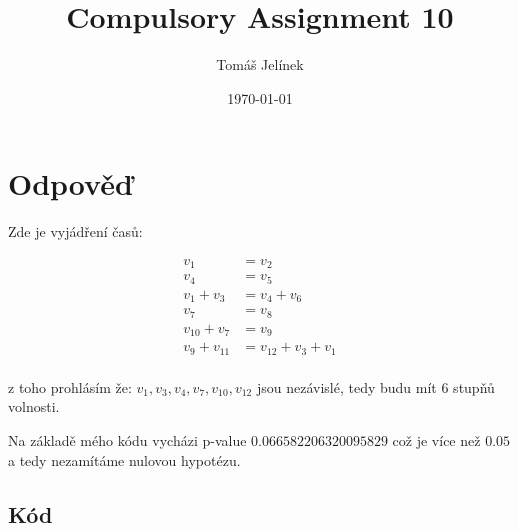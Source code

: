 \documentclass{article}
\title{Compulsory Assignment 10}
\author{Tomáš Jelínek}
\date{\today}
\begin{document}
\maketitle
\section*{Odpověď}

Zde je vyjádření časů:

\begin{align*}
    v_1 &= v_2 \\
    v_4 &= v_5 \\
    v_1 + v_3 &= v_4 + v_6 \\
    \hline
    v_7 &= v_8 \\
    v_{10} + v_7 &= v_9 \\
    v_9 + v_{11} &= v_{12} + v_3 + v_1 \\
    \end{align*}

z toho prohlásím že: $v_1, v_3, v_4, v_7, v_{10}, v_{12}$ jsou nezávislé, tedy budu mít 6 stupňů volnosti.

Na základě mého kódu vycházi p-value $0.066582206320095829$ což je více než $0.05$ a tedy nezamítáme nulovou hypotézu.

\subsection*{Kód}

\end{document}
